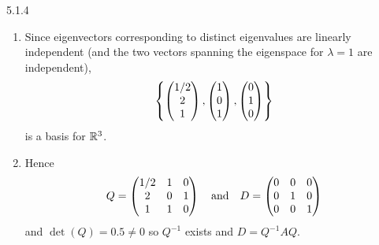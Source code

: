 \documentclass{exam}
\begin{document}
\begin{problem}{5.1.4}
\begin{parts}
\begin{enumerate}[label=\roman*.)]
        \item Since eigenvectors corresponding to distinct eigenvalues are linearly independent (and the two vectors spanning the eigenspace for $\lambda = 1$ are independent), 
        \[
          \left\{\begin{pmatrix}
            1/2 \\ 2 \\ 1
          \end{pmatrix}, \begin{pmatrix}
            1 \\ 0 \\ 1
          \end{pmatrix}, \begin{pmatrix}
            0 \\ 1 \\ 0
          \end{pmatrix} \right\}
        \]
        is a basis for $\mathbb R^3$.

        \item Hence 
        \[
          Q = \begin{pmatrix}
            1/2 & 1 & 0 \\
            2 & 0 & 1 \\
            1 & 1 & 0
          \end{pmatrix}
          \quad\text{and}\quad 
          D = \begin{pmatrix}
            0 & 0 & 0 \\
            0 & 1 & 0 \\
            0 & 0 & 1
          \end{pmatrix}
        \]
        and $\det(Q) = 0.5 \neq 0$ so $Q^{-1}$ exists and $D = Q^{-1}AQ$.
      \end{enumerate}
    \end{parts}
  \end{problem}
\end{document}
